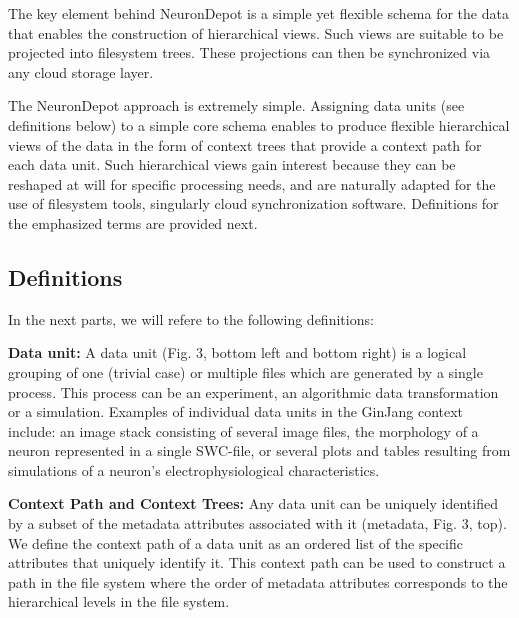 \documentclass{frontiersSCNS} %
\begin{document}
The key element behind NeuronDepot is a simple yet flexible schema for the data
that enables the construction of  hierarchical views. Such views are suitable
to be projected into filesystem trees. These projections can then be
synchronized via any cloud storage layer. 

The NeuronDepot approach is extremely simple. Assigning data units (see
definitions below) to a simple core schema enables to produce flexible
hierarchical views of the data in the form of context trees that provide a
context path for each data unit. Such hierarchical views gain interest because
they can be reshaped at will for specific processing needs, and are naturally
adapted for the use of filesystem tools, singularly cloud synchronization
software. Definitions for the emphasized terms are provided next.


\subsection{Definitions}

In the next parts, we will refere to the following definitions:

\textbf{Data unit:} A data unit (Fig. 3, bottom left and  bottom right) is a
logical grouping of one (trivial case) or multiple files which are generated by
a single process. This process can be an experiment, an algorithmic data
transformation or a simulation. Examples of individual data units in the
GinJang context include: an image stack consisting of several image files, the
morphology of a neuron represented in a single SWC-file, or several plots and
tables resulting from simulations of a neuron's electrophysiological
characteristics.

\textbf{Context Path and Context Trees:} Any data unit can be uniquely
identified by a subset of the metadata attributes associated with it (metadata,
Fig. 3, top). We define the context path of a data unit as an ordered list of
the specific attributes that uniquely identify it. This context path can be
used to construct a path in the file system where the order of metadata
attributes corresponds to the hierarchical levels in the file system. 
\end{document}
